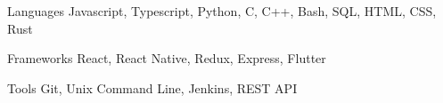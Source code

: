 

\begin{cvskills}

  \cvskill
    {Languages} %
    {Javascript, Typescript, Python, C, C++, Bash, SQL, HTML, CSS, Rust} %

  \cvskill
    {Frameworks} %
    {React, React Native, Redux, Express, Flutter} %

  \cvskill
    {Tools} %
    {Git, Unix Command Line, Jenkins, REST API} %

\end{cvskills}
